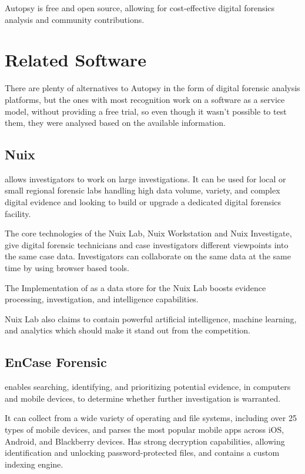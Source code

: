Autopsy is free and open source, allowing for cost-effective digital forensics analysis and community contributions.

\section{Related Software}

There are plenty of alternatives to Autopsy in the form of digital forensic analysis platforms, but the ones with most recognition work on a software as a service model, 
without providing a free trial, so even though it wasn't possible to test them, they were analysed based on the available information.

\subsection{Nuix}

 \cite{nuix} allows investigators to work on large investigations.
It can be used for local or small regional forensic labs handling high data volume, variety, and 
complex digital evidence and looking to build or upgrade a dedicated digital forensics facility.

The core technologies of the Nuix Lab, Nuix Workstation and Nuix Investigate, give digital forensic technicians and case investigators 
different viewpoints into the same case data. Investigators can collaborate on 
the same data at the same time by using browser based tools.

The Implementation of  \cite{elasticsearch} as a data store for the Nuix Lab boosts evidence processing, investigation, and intelligence capabilities. 

Nuix Lab also claims to contain powerful artificial intelligence, machine learning, and analytics which should make it stand out from the competition. 

\subsection{EnCase Forensic}

 \cite{encase} enables searching, identifying, and prioritizing potential evidence, in computers and mobile devices, to determine whether 
further investigation is warranted.

It can collect from a wide variety of operating and file systems, including over 25 types of mobile devices, and parses the most popular mobile apps across iOS, Android, and Blackberry devices.
Has strong decryption capabilities, allowing identification and unlocking password-protected files, and contains a custom indexing engine.

